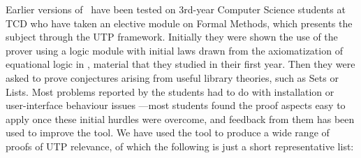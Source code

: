 Earlier versions of \STHN\ have been tested on 3rd-year Computer Science
students at TCD who have taken an elective module on Formal Methods,
which presents the subject through the UTP framework.
Initially they were shown the use of the prover using a logic module
with initial laws drawn from the axiomatization of equational logic
in \cite{Gries-Schneider94},
material that they studied in their first year.
Then they were asked to prove conjectures arising from useful library theories,
such as Sets or Lists.
Most problems reported by the students had to do with installation or user-interface
behaviour issues%
---most students found the proof aspects easy to apply once these initial hurdles
were overcome, and feedback from them has been used to improve the tool.
We have used the tool to produce a wide range of proofs of UTP relevance,
of which the following is just a short representative list:
